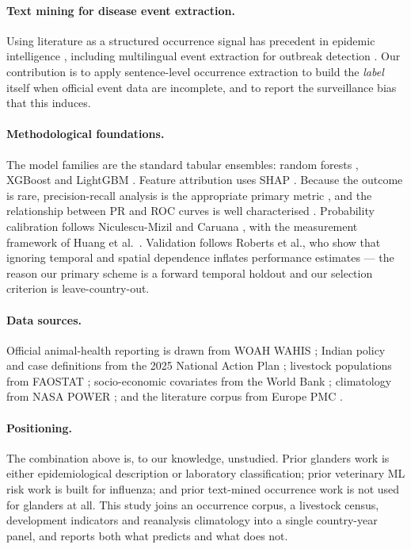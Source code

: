 \documentclass[11pt]{article}
\begin{document}
\paragraph{Text mining for disease event extraction.}
Using literature as a structured occurrence signal has precedent in epidemic intelligence
\cite{collier2012}, including multilingual event extraction for outbreak
detection \cite{lejeune2015}. Our contribution is to apply sentence-level occurrence
extraction to build the \emph{label} itself when official event data are incomplete, and
to report the surveillance bias that this induces.

\paragraph{Methodological foundations.}
The model families are the standard tabular ensembles: random forests \cite{breiman2001},
XGBoost \cite{chen2016} and LightGBM \cite{ke2017}. Feature attribution uses
SHAP \cite{lundberg2017}. Because the outcome is rare, precision-recall analysis is the
appropriate primary metric \cite{saito2015}, and the relationship between PR and ROC
curves is well characterised \cite{davis2006}. Probability calibration follows
Niculescu-Mizil and Caruana \cite{niculescu2005}, with the measurement framework of Huang
et al.\ \cite{huang2020}. Validation follows Roberts et al., who show that ignoring
temporal and spatial dependence inflates performance estimates \cite{roberts2017} --- the
reason our primary scheme is a forward temporal holdout and our selection criterion is
leave-country-out.

\paragraph{Data sources.}
Official animal-health reporting is drawn from WOAH WAHIS \cite{wahis}; Indian policy and
case definitions from the 2025 National Action Plan \cite{dahd2025}; livestock
populations from FAOSTAT \cite{faostat}; socio-economic covariates from the World Bank
\cite{wdi}; climatology from NASA POWER \cite{power}; and the literature corpus from
Europe PMC \cite{europepmc}.

\paragraph{Positioning.}
The combination above is, to our knowledge, unstudied. Prior glanders work is either
epidemiological description or laboratory classification; prior veterinary ML risk work is
built for influenza; and prior text-mined occurrence work is not used for glanders at all.
This study joins an occurrence corpus, a livestock census, development indicators and
reanalysis climatology into a single country-year panel, and reports both what predicts and
what does not.
\end{document}
